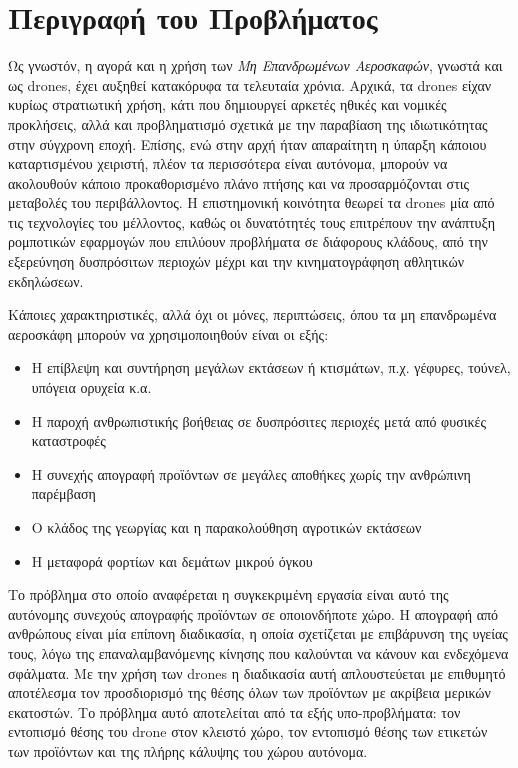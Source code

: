 \section{Περιγραφή του Προβλήματος}
\label{section:problem_description}

Ως γνωστόν, η αγορά και η χρήση των \emph{Μη Επανδρωμένων Αεροσκαφών}, γνωστά και ως drones, έχει αυξηθεί κατακόρυφα τα τελευταία χρόνια. Αρχικά, τα drones είχαν κυρίως στρατιωτική χρήση, κάτι που δημιουργεί αρκετές ηθικές και νομικές προκλήσεις, αλλά και προβληματισμό σχετικά με την παραβίαση της ιδιωτικότητας στην σύγχρονη εποχή. Επίσης, ενώ στην αρχή ήταν απαραίτητη η ύπαρξη κάποιου καταρτισμένου χειριστή, πλέον τα περισσότερα είναι αυτόνομα, μπορούν να ακολουθούν κάποιο προκαθορισμένο πλάνο πτήσης και να προσαρμόζονται στις μεταβολές του περιβάλλοντος. Η επιστημονική κοινότητα θεωρεί τα drones μία από τις τεχνολογίες του μέλλοντος, καθώς οι δυνατότητές τους επιτρέπουν την ανάπτυξη ρομποτικών εφαρμογών που επιλύουν προβλήματα σε διάφορους κλάδους, από την εξερεύνηση δυσπρόσιτων περιοχών μέχρι και την κινηματογράφηση αθλητικών εκδηλώσεων.

Κάποιες χαρακτηριστικές, αλλά όχι οι μόνες, περιπτώσεις, όπου τα μη επανδρωμένα αεροσκάφη μπορούν να χρησιμοποιηθούν είναι οι εξής:

\begin{itemize}

  \item{Η επίβλεψη και συντήρηση μεγάλων εκτάσεων ή κτισμάτων, π.χ. γέφυρες, τούνελ, υπόγεια ορυχεία κ.α.}
  \item{Η παροχή ανθρωπιστικής βοήθειας σε δυσπρόσιτες περιοχές μετά από φυσικές καταστροφές}
  \item{Η συνεχής απογραφή προϊόντων σε μεγάλες αποθήκες χωρίς την ανθρώπινη παρέμβαση} 
   \item{Ο κλάδος της γεωργίας και η παρακολούθηση αγροτικών εκτάσεων}
  \item{Η μεταφορά φορτίων και δεμάτων μικρού όγκου}

\end{itemize}

Το πρόβλημα στο οποίο αναφέρεται η συγκεκριμένη εργασία είναι αυτό της αυτόνομης συνεχούς απογραφής προϊόντων σε οποιονδήποτε χώρο. Η απογραφή από ανθρώπους είναι μία επίπονη διαδικασία, η οποία σχετίζεται με επιβάρυνση της υγείας τους, λόγω της επαναλαμβανόμενης κίνησης που καλούνται να κάνουν και ενδεχόμενα σφάλματα. Με την χρήση των drones η διαδικασία αυτή απλουστεύεται με επιθυμητό αποτέλεσμα τον προσδιορισμό της θέσης όλων των προϊόντων με ακρίβεια μερικών εκατοστών. Το πρόβλημα αυτό αποτελείται από τα εξής υπο-προβλήματα: τον εντοπισμό θέσης του drone στον κλειστό χώρο, τον εντοπισμό θέσης των ετικετών των προϊόντων και της πλήρης κάλυψης του χώρου αυτόνομα.

